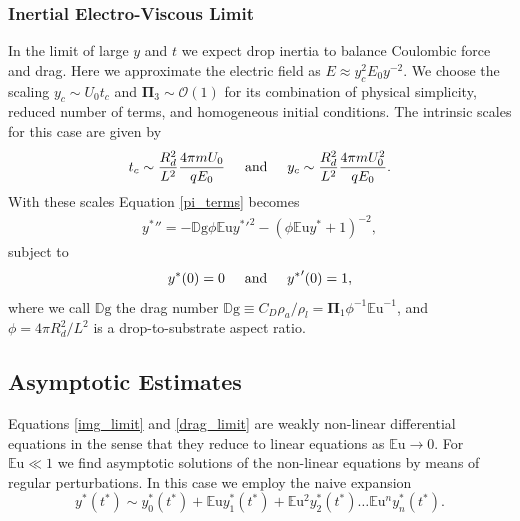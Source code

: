 \documentclass[aip,reprint, floatfix]{revtex4-1}
\begin{document}
\subsubsection{Inertial Electro-Viscous Limit}
In the limit of large $y$ and $t$ we expect drop inertia to balance Coulombic force and drag. Here we approximate the electric field as $E \approx y_c^2 E_0 y^{-2}$. We choose the scaling $y_c \sim U_0 t_c$ and $\mathbf{\Pi}_3 \sim \mathcal{O}(1)$ for its combination of physical simplicity, reduced number of terms, and homogeneous initial conditions. The intrinsic scales for this case are given by
\[ t_c \sim \frac{R_d^2}{L^2} \frac{4 \pi m U_0}{q E_0} \hspace{5mm} \mbox{and} \hspace{5 mm} y_c \sim \frac{R_d^2}{L^2} \frac{4 \pi m U_0^2}{q E_0}.
\]
With these scales Equation \ref{pi_terms} becomes 
\begin{eqnarray}
&{y^*}'' = - \mathbb{D}\mbox{g} \phi \mathbb{E}\mbox{u} {y^*}'^2 - \left( \phi \mathbb{E}\mbox{u} {y^*} + 1 \right)^{-2}, & \label{drag_limit}
\end{eqnarray}
subject to 
\begin{equation*}
{y^*}(0) = 0 \hspace{5 mm} \mbox{and} \hspace{5 mm} {y^*}'(0) = 1, 
\end{equation*}
where we call $\mathbb{D}\mbox{g}$ the drag number $\mathbb{D}\mbox{g} \equiv C_D \rho_a / \rho_l = \mathbf{\Pi}_1 \phi^{-1}{\mathbb{E}\mbox{u}}^{-1}$, and $\phi = 4 \pi R_d^2 / L^2$ is a drop-to-substrate aspect ratio.

\subsection{Asymptotic Estimates}
Equations \ref{img_limit} and \ref{drag_limit} are weakly non-linear differential equations in the sense that they reduce to linear equations as $\mathbb{E}\mbox{u} \rightarrow 0$. For $\mathbb{E}\mbox{u} \ll 1$ we find asymptotic solutions of the non-linear equations by means of regular perturbations. In this case we employ the naive expansion
\begin{equation}
{y^*}({t^*}) \sim y^*_0({t^*}) + \mathbb{E}\mbox{u} y^*_1({t^*}) + \mathbb{E}\mbox{u}^2 y^*_2({t^*}) \ldots \mathbb{E}\mbox{u}^n y^*_n ({t^*})  . \label{regular_pert}
\end{equation}
\end{document}
